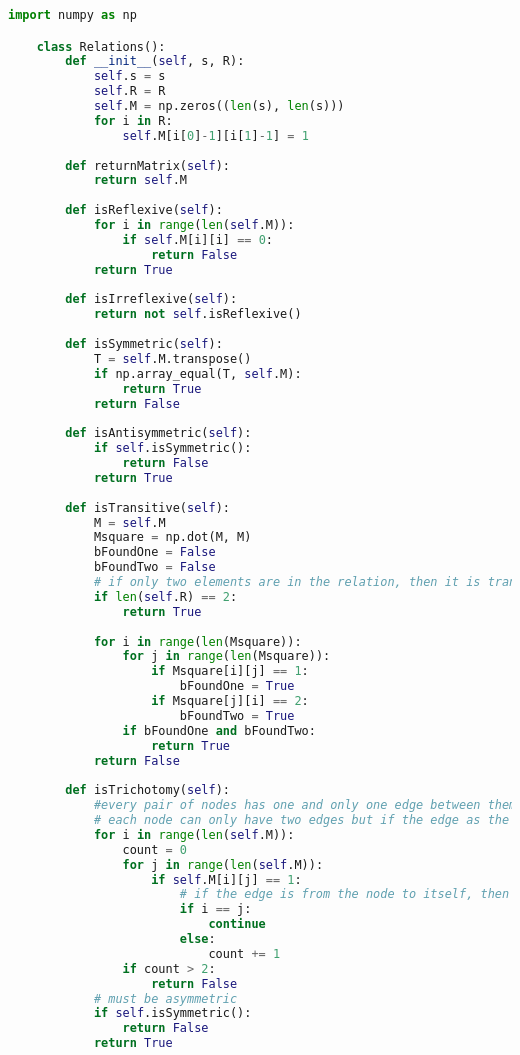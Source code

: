 \begin{lstlisting}[language=Python]
    import numpy as np

    class Relations():
        def __init__(self, s, R):
            self.s = s
            self.R = R
            self.M = np.zeros((len(s), len(s)))
            for i in R:
                self.M[i[0]-1][i[1]-1] = 1
    
        def returnMatrix(self):
            return self.M
    
        def isReflexive(self):
            for i in range(len(self.M)):
                if self.M[i][i] == 0:
                    return False
            return True
    
        def isIrreflexive(self):
            return not self.isReflexive()
    
        def isSymmetric(self):
            T = self.M.transpose()
            if np.array_equal(T, self.M):
                return True
            return False
    
        def isAntisymmetric(self):
            if self.isSymmetric():
                return False
            return True
    
        def isTransitive(self):
            M = self.M
            Msquare = np.dot(M, M)
            bFoundOne = False
            bFoundTwo = False
            # if only two elements are in the relation, then it is transitive (We cannot prove that R is not transitive. Such a proof actually has a special name: it is vacuously true that R is transitive.)
            if len(self.R) == 2:
                return True
    
            for i in range(len(Msquare)):
                for j in range(len(Msquare)):
                    if Msquare[i][j] == 1:
                        bFoundOne = True
                    if Msquare[j][i] == 2:
                        bFoundTwo = True
                if bFoundOne and bFoundTwo:
                    return True
            return False
    
        def isTrichotomy(self):
            #every pair of nodes has one and only one edge between them.                 
            # each node can only have two edges but if the edge as the node as the source and destination, then it is ok
            for i in range(len(self.M)):
                count = 0
                for j in range(len(self.M)):
                    if self.M[i][j] == 1:
                        # if the edge is from the node to itself, then it is ok
                        if i == j:
                            continue
                        else:
                            count += 1
                if count > 2:
                    return False
            # must be asymmetric
            if self.isSymmetric():
                return False            
            return True
    

\end{lstlisting}
